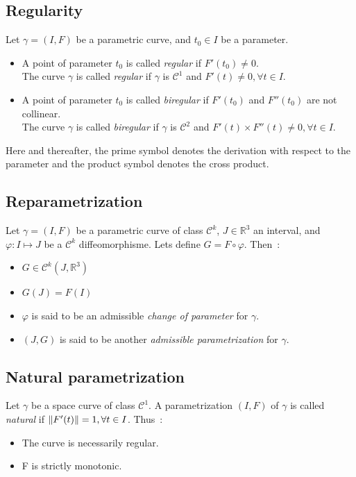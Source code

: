 \subsection{Regularity}
Let $\gamma=(I,F)$ be a parametric curve, and $t_0 \in I$ be a parameter.
\begin{itemize}
	\item A point of parameter $t_0$ is called \emph{regular} if $F'(t_0) \neq 0$.
	\\The curve $\gamma$ is called \emph{regular} if $\gamma$ is $\mathcal{C}^{1}$ and $F'(t) \neq 0, \forall t \in I$.
	\item A point of parameter $t_0$ is called \emph{biregular} if $F'(t_0)$ and $F''(t_0)$ are not collinear.
	\\The curve $\gamma$ is called \emph{biregular} if $\gamma$ is $\mathcal{C}^{2}$ and  $F'(t) \times F''(t) \neq 0, \forall t \in I$.
\end{itemize}
Here and thereafter, the prime symbol denotes the derivation with respect to the parameter and the product symbol denotes the cross product.
\subsection{Reparametrization}
Let $\gamma=(I,F)$ be a parametric curve of class ${\mathcal{C}}^{k}$, $J \in {\mathbb{R}}^{3}$ an interval, and $\varphi\colon I\mapsto J$ be a ${\mathcal{C}}^{k}$ diffeomorphisme. Lets define $G=F\circ\varphi$. Then~:
\begin{itemize}
	\item $G\in{\mathcal{C}}^{k}(J,{\mathbb{R}}^3)$
	\item $G(J)=F(I)$
	\item $\varphi$ is said to be an admissible \emph{change of parameter} for $\gamma$.
	\item  $(J,G)$ is said to be another \emph{admissible parametrization} for $\gamma$.
\end{itemize}

\subsection{Natural parametrization}
Let $\gamma$ be a space curve of class ${\mathcal{C}}^{1}$. A parametrization $(I,F)$ of $\gamma$ is called \emph{natural} if $\lVert F'(t)\rVert = 1, \forall t \in I$. Thus~:
\begin{itemize}
	\item The curve is necessarily regular.
	\item F is strictly monotonic.
\end{itemize}

